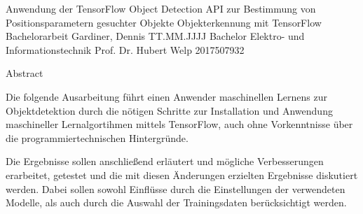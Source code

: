 \documentclass[12pt, oneside]{article}
\begin{document}
\titlespacing{\section}{0pt}{0pt}{0pt}
\titlespacing{\subsection}{0pt}{6pt}{0pt}
\titlespacing{\subsubsection}{0pt}{6pt}{0pt}

  \JMUTitle
      {Anwendung der TensorFlow Object Detection API zur Bestimmung von Positionsparametern gesuchter Objekte}                                %
      {Objekterkennung mit TensorFlow}                            %
      {Bachelorarbeit}       %
      {Gardiner, Dennis}                              %
      {TT.MM.JJJJ}                                      %
      {Bachelor Elektro- und Informationstechnik}           %
      {Prof. Dr. Hubert Welp}                       %
      {2017507932}                                         %


\newpage
{}

\Zusammenfassung
{Abstract}
{
	Die folgende Ausarbeitung führt einen Anwender maschinellen Lernens zur Objektdetektion durch die nötigen Schritte zur Installation und Anwendung maschineller Lernalgortihmen mittels TensorFlow, auch ohne Vorkenntnisse über die programmiertechnischen Hintergründe.
	
	Die Ergebnisse sollen anschließend erläutert und mögliche Verbesserungen erarbeitet, getestet und die mit diesen Änderungen erzielten Ergebnisse diskutiert werden. Dabei sollen sowohl Einflüsse durch die Einstellungen der verwendeten Modelle, als auch durch die Auswahl der Trainingsdaten berücksichtigt werden.
	
	
	
	

}
\end{document}
